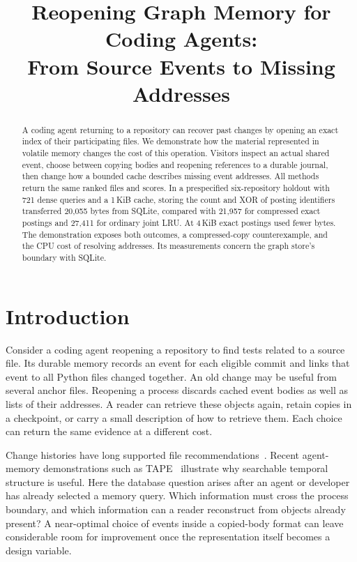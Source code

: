 \documentclass[conference]{IEEEtran}
\title{Reopening Graph Memory for Coding Agents:\\From Source Events to Missing Addresses}
\author{\IEEEauthorblockN{Anonymous working draft}}
\begin{document}
\maketitle
\begin{abstract}
A coding agent returning to a repository can recover past changes by opening an exact index of their participating files. We demonstrate how the material represented in volatile memory changes the cost of this operation. Visitors inspect an actual shared event, choose between copying bodies and reopening references to a durable journal, then change how a bounded cache describes missing event addresses. All methods return the same ranked files and scores. In a prespecified six-repository holdout with 721 dense queries and a 1\,KiB cache, storing the count and XOR of posting identifiers transferred 20,055 bytes from SQLite, compared with 21,957 for compressed exact postings and 27,411 for ordinary joint LRU. At 4\,KiB exact postings used fewer bytes. The demonstration exposes both outcomes, a compressed-copy counterexample, and the CPU cost of resolving addresses. Its measurements concern the graph store's boundary with SQLite.
\end{abstract}
\section{Introduction}
Consider a coding agent reopening a repository to find tests related to a source file. Its durable memory records an event for each eligible commit and links that event to all Python files changed together. An old change may be useful from several anchor files. Reopening a process discards cached event bodies as well as lists of their addresses. A reader can retrieve these objects again, retain copies in a checkpoint, or carry a small description of how to retrieve them. Each choice can return the same evidence at a different cost.

Change histories have long supported file recommendations~\cite{rose,moonen}. Recent agent-memory demonstrations such as TAPE~\cite{tape} illustrate why searchable temporal structure is useful. Here the database question arises after an agent or developer has already selected a memory query. Which information must cross the process boundary, and which information can a reader reconstruct from objects already present? A near-optimal choice of events inside a copied-body format can leave considerable room for improvement once the representation itself becomes a design variable.
\end{document}
